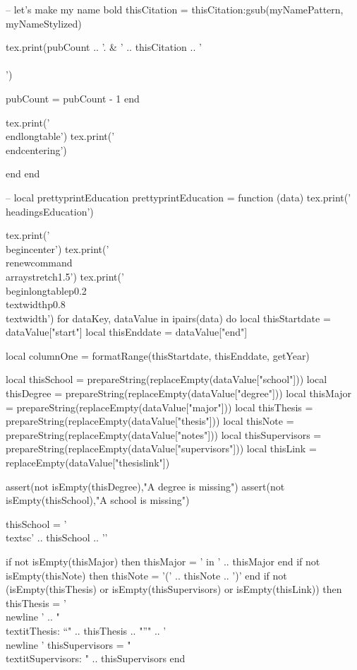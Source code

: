 \documentclass[letterpaper, 10pt]{article}
\newcommand{\headings}[1]{\section*{#1} \hrule \vspace{10pt}}
\begin{document}
\begin{luacode}
				-- let's make my name bold
				thisCitation = thisCitation:gsub(myNamePattern, myNameStylized)

				tex.print(pubCount .. '. & ' .. thisCitation .. '\\\\')

				pubCount = pubCount - 1
			end

			tex.print('\\end{longtable}')
			tex.print('\\end{centering}')

		end
	end

	-- local prettyprintEducation
	prettyprintEducation = function (data)
		tex.print('\\headings{Education}')

		tex.print('\\begin{center}')
		tex.print('\\renewcommand{\\arraystretch}{1.5}')
		tex.print('\\begin{longtable}{p{0.2\\textwidth}p{0.8\\textwidth}}')
		for dataKey, dataValue in ipairs(data) do
			local thisStartdate = dataValue["start"]
			local thisEnddate   = dataValue["end"]

			local columnOne = formatRange(thisStartdate, thisEnddate, getYear)

			local thisSchool    	= prepareString(replaceEmpty(dataValue["school"]))
			local thisDegree    	= prepareString(replaceEmpty(dataValue["degree"]))
			local thisMajor    		= prepareString(replaceEmpty(dataValue["major"]))
			local thisThesis 		= prepareString(replaceEmpty(dataValue["thesis"]))
			local thisNote 			= prepareString(replaceEmpty(dataValue["notes"]))
			local thisSupervisors 	= prepareString(replaceEmpty(dataValue["supervisors"]))
			local thisLink 			= replaceEmpty(dataValue["thesislink"])

			assert(not isEmpty(thisDegree),"A degree is missing")
			assert(not isEmpty(thisSchool),"A school is missing")

			thisSchool = '\\textsc{' .. thisSchool .. '}'

			if not isEmpty(thisMajor) then
				thisMajor = ' in ' .. thisMajor
			end
			if not isEmpty(thisNote) then
				thisNote = '(' .. thisNote .. ')'
			end
			if not (isEmpty(thisThesis) or isEmpty(thisSupervisors) or isEmpty(thisLink)) then
				thisThesis = '\\newline ' .. "\\textit{Thesis}: ``" .. thisThesis .. "''" .. '\\newline '
				thisSupervisors = "\\textit{Supervisors}: " .. thisSupervisors
			end


\end{luacode}
\end{document}
